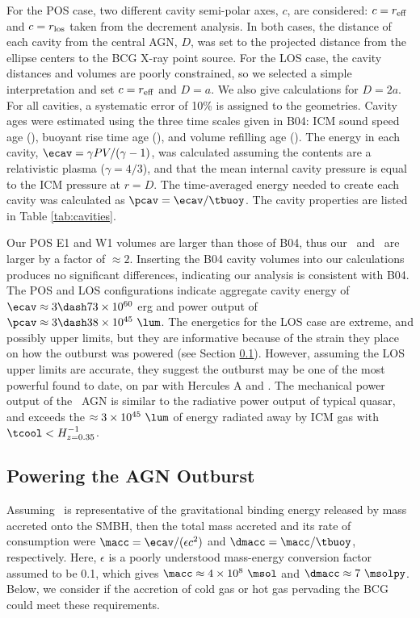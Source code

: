 \documentclass{emulateapj}
\begin{document}
For the POS case, two different cavity semi-polar axes, $c$, are
considered: $c = r_{\rm{eff}}$ and $c = r_{\rm{los}}$ taken from the decrement
analysis. In both cases, the distance of each cavity from the central
AGN, $D$, was set to the projected distance from the ellipse centers
to the BCG X-ray point source. For the LOS case, the cavity distances
and volumes are poorly constrained, so we selected a simple
interpretation and set $c = r_{\rm{eff}}$ and $D = a$. We also give
calculations for $D = 2a$. For all cavities, a systematic error of
10\% is assigned to the geometries. Cavity ages were estimated using
the three time scales given in B04: ICM sound speed age (\tsonic),
buoyant rise time age (\tbuoy), and volume refilling age
(\trefill). The energy in each cavity, $\ecav = \gamma PV/(\gamma-1)$,
was calculated assuming the contents are a relativistic plasma
($\gamma = 4/3$), and that the mean internal cavity pressure is equal
to the ICM pressure at $r = D$. The time-averaged energy needed to
create each cavity was calculated as $\pcav = \ecav/\tbuoy$. The
cavity properties are listed in Table \ref{tab:cavities}.

Our POS E1 and W1 volumes are larger than those of B04, thus our
\ecav\ and \pcav\ are larger by a factor of $\approx 2$. Inserting the
B04 cavity volumes into our calculations produces no significant
differences, indicating our analysis is consistent with B04. The POS
and LOS configurations indicate aggregate cavity energy of $\ecav
\approx 3 \dash 73 \times 10^{60}$ erg and power output of $\pcav
\approx 3 \dash 38 \times 10^{45} ~\lum$. The energetics for the LOS
case are extreme, and possibly upper limits, but they are informative
because of the strain they place on how the outburst was powered (see
Section \ref{sec:accretion}). However, assuming the LOS upper limits
are accurate, they suggest the outburst may be one of the most
powerful found to date, on par with Hercules A and \ms. The mechanical
power output of the \rbs\ AGN is similar to the radiative power output
of typical quasar, and exceeds the $\approx 3 \times 10^{45} ~\lum$ of
energy radiated away by ICM gas with $\tcool < H_{z=0.35}^{-1}$.

\subsection{Powering the AGN Outburst}
\label{sec:accretion}

Assuming \ecav\ is representative of the gravitational binding energy
released by mass accreted onto the SMBH, then the total mass accreted
and its rate of consumption were $\macc = \ecav/(\epsilon c^2)$ and
$\dmacc = \macc/\tbuoy$, respectively. Here, $\epsilon$ is a poorly
understood mass-energy conversion factor assumed to be 0.1, which
gives $\macc \approx 4 \times 10^8 ~\msol$ and $\dmacc \approx 7
~\msolpy$. Below, we consider if the accretion of cold gas or hot gas
pervading the BCG could meet these requirements.
\end{document}
